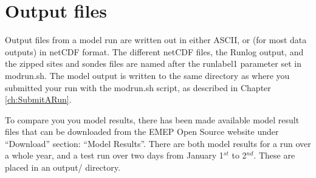 \chapter{Output files}
\label{ch:output}

Output files from a model run are written out in either ASCII, or
(for most data outputs) in netCDF format. 
The different netCDF files, the Runlog output, and the zipped sites and sondes 
files are named after the runlabel1 parameter set in modrun.sh. 
The model output is written to the same directory as where you submitted 
your run with the modrun.sh script, as described in Chapter \ref{ch:SubmitARun}.

To compare you you model results, there has been made available model result files 
that can be downloaded  from the EMEP Open Source website under ``Download'' section: ``Model Results''. 
There are both model results for a run over a whole year, and a test run over two days from 
January 1$^{st}$ to 2$^{nd}$. These are placed in an output/ directory. 
 

